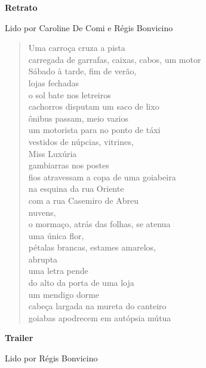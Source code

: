 \pagebreak

\textbf{Retrato}

Lido por Caroline De Comi e Régis Bonvicino

\begin{verse}
Uma carroça cruza a pista\\
carregada de garrafas, caixas, cabos, um motor\\
Sábado à tarde, fim de verão,\\
lojas fechadas\\[5pt]
o sol bate nos letreiros\\
cachorros disputam um saco de lixo\\
ônibus passam, meio vazios\\
um motorista para no ponto de táxi\\[5pt]
vestidos de núpcias, vitrines,\\
Miss Luxúria\\
gambiarras nos postes\\
fios atravessam a copa de uma goiabeira\\[5pt]
na esquina da rua Oriente\\
com a rua Casemiro de Abreu\\
nuvens,\\
o mormaço, atrás das folhas, se atenua\\[5pt]
uma única flor,\\
pétalas brancas, estames amarelos,\\
abrupta\\
uma letra pende\\[5pt]
do alto da porta de uma loja\\
um mendigo dorme\\
cabeça largada na mureta do canteiro\\
goiabas apodrecem em autópsia mútua
\end{verse}

\pagebreak
\textbf{Trailer}

Lido por Régis Bonvicino

